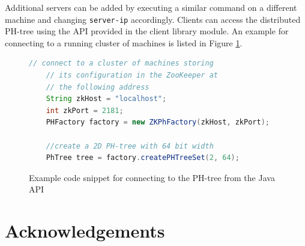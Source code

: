 \documentclass[11pt,a4paper]{globis-book}
\begin{document}
Additional servers can be added by executing a similar command on a different machine and changing \texttt{server-ip} accordingly. Clients can access the distributed PH-tree using the API provided in the client library module. An example for connecting to a running cluster of machines is listed in Figure \ref{fig:java-code}.

\begin{figure}
\begin{lstlisting}[language=Java]       
    // connect to a cluster of machines storing 
    // its configuration in the ZooKeeper at 
    // the following address 
    String zkHost = "localhost";
    int zkPort = 2181;
    PHFactory factory = new ZKPhFactory(zkHost, zkPort);

    //create a 2D PH-tree with 64 bit width
    PhTree tree = factory.createPHTreeSet(2, 64);    
\end{lstlisting}
\caption{Example code snippet for connecting to the PH-tree from the Java API}
\label{fig:java-code}
\end{figure}
\listoffigures
\listoftables

\chapter*{Acknowledgements}

\newpage
\thispagestyle{empty}



\end{document}
